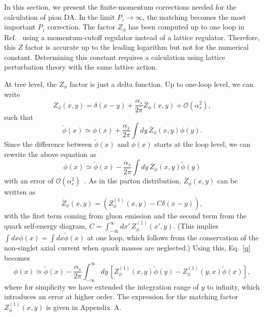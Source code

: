 

In this section, we present the finite-momentum corrections needed for the calculation of pion DA. In the limit $P_z \rightarrow \infty$, the matching becomes the most
important $P_z$ correction. The factor
$Z_\phi$
has been computed up to one loop in
Ref.~\cite{Ji:2015qla} using a momentum-cutoff regulator instead of a
lattice regulator. Therefore, this $Z$ factor is accurate up to the
leading logarithm but not for the numerical constant. Determining this
constant requires a calculation using lattice perturbation theory with the same lattice
action.

At tree level, the $Z_\phi$ factor is just a delta function. Up to one-loop level, we can write
\begin{equation}
Z_\phi(x, y) = \delta (x-y) + \frac{\alpha_s}{2\pi} \overline{Z}_\phi(x, y)
  + \mathcal{O}\left(\alpha_s^2 \right),
\end{equation}
such that
\begin{equation}
\tilde{\phi}(x) \simeq \phi(x)
  + \frac{\alpha_s}{2\pi} \int dy\,
    \overline{Z}_\phi\!\left(x, y\right)\phi(y).
\end{equation}
Since the difference between $\tilde{\phi}(x)$ and $\phi(x)$ starts at
the loop level, we can rewrite the above equation as
\begin{equation}
\phi(x) \simeq \tilde{\phi}(x)
  - \frac{\alpha_s}{2\pi} \int dy\,
    \overline{Z}_\phi\!\left(x, y\right)\tilde{\phi}(y)
\label{q}
\end{equation}
with an error of $\mathcal{O}\left(\alpha_s^2\right)$~\cite{Ma:2014jla}. As in the parton distribution, $\overline{Z}_\phi(x, y)$ can be written as
%
\begin{equation}\label{eq7}
\overline{Z}_\phi(x, y) = \left(Z_\phi^{(1)}(x, y) - C\delta(x-y)\right),
\end{equation}
with the first term coming from gluon emission and the second term from the quark
self-energy diagram, $C=\int_{-\infty}^{\infty} d x'\,Z_\phi^{(1)}(x', y)$. (This implies $\int dx \phi(x)=\int dx \tilde{\phi}(x)$ at one loop, which follows from the conservation of the non-singlet axial current when quark masses are neglected.) Using this, Eq.~\ref{q} becomes
\begin{equation}
\phi(x) \simeq \tilde{\phi}(x)
  - \frac{\alpha_s}{2\pi} \int_{-\infty}^{\infty}\!dy\,
  \left[ Z_\phi^{(1)}\!\left(x, y\right)
    \tilde{\phi}(y)
  - Z_\phi^{(1)}\!\left(y, x\right)
    \tilde{\phi}(x)\right] ,  \label{cov}
\end{equation}
where for simplicity we have extended the integration range of $y$ to infinity, which introduces an error at higher order. The expression for the matching factor $Z_\phi^{(1)}(x, y)$ is given in Appendix~A.


